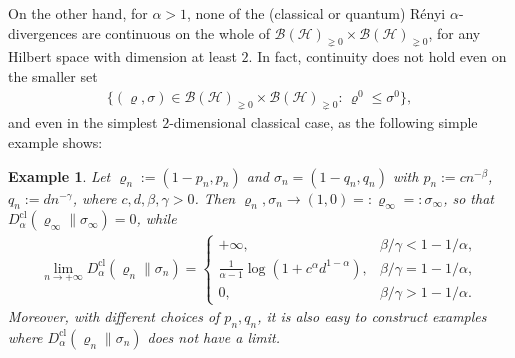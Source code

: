 \documentclass[unsortedaddress,superscriptaddress,pra,notitlepage]{revtex4}
\newtheorem{example}[definition]{Example}
\def\B{{\mathcal B}}
\def\rho{\varrho}
\def\hil{{\mathcal H}}
\def\pne{_{\gneq 0}}
\def\cl{\mathrm{cl}}
\def\cl{\mathrm{cl}}
\begin{document}
On the other hand, for $\alpha>1$, none of the (classical or quantum) R\'enyi 
$\alpha$-divergences are continuous on the whole of $\B(\hil)\pne\times\B(\hil)\pne$, for 
any Hilbert space with dimension at least $2$. 
In fact, continuity does not hold even on the smaller set 
\begin{align*}
\{(\rho,\sigma)\in\B(\hil)\pne\times\B(\hil)\pne:\,\rho^0\le\sigma^0\},
\end{align*}
and even in the simplest $2$-dimensional classical case, as the following simple example shows:

\begin{example}\label{rem:discont}
Let
$\rho_n:=(1-p_n,p_n)$ and $\sigma_n=(1-q_n,q_n)$ with $p_n:=cn^{-\beta}$,
$q_n:=dn^{-\gamma}$, where $c,d,\beta,\gamma>0$.
Then $\rho_n,\sigma_n\to (1,0)=:\rho_{\infty}=:\sigma_{\infty}$, so that 
$D_{\alpha}^{\cl}( \rho_{\infty}\|\sigma_{\infty})=0$, while 
\begin{align*}
\lim_{n\to+\infty}D_{\alpha}^{\cl}(\rho_n\|\sigma_n)=
\begin{cases}
+\infty,&\beta/\gamma<1-1/\alpha,\\
\frac{1}{\alpha-1}\log(1+c^{\alpha}d^{1-\alpha}),&\beta/\gamma=1-1/\alpha,\\
0,&\beta/\gamma>1-1/\alpha.
\end{cases}
\end{align*} 
Moreover, with different choices of $p_n,q_n$, it is also easy to construct examples where 
$D_{\alpha}^{\cl}(\rho_n\|\sigma_n)$ does not have a limit.
\end{example}
\end{document}
